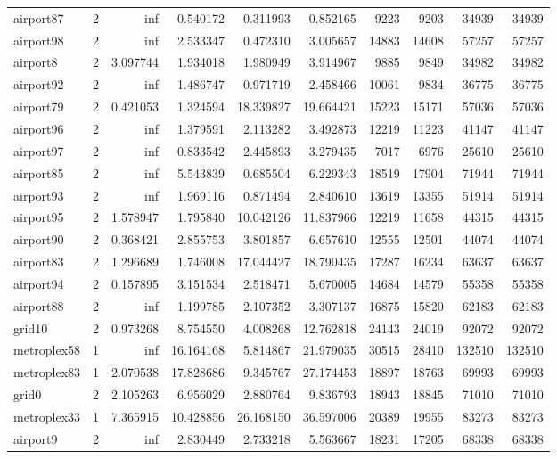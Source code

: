 \begin{longtable}{|l|r|r|r|r|r|r|r|r|r|}
airport87 & 2 & inf & 0.540172 & 0.311993 & 0.852165 & 9223 & 9203 & 34939 & 34939 \\
airport98 & 2 & inf & 2.533347 & 0.472310 & 3.005657 & 14883 & 14608 & 57257 & 57257 \\
airport8 & 2 & 3.097744 & 1.934018 & 1.980949 & 3.914967 & 9885 & 9849 & 34982 & 34982 \\
airport92 & 2 & inf & 1.486747 & 0.971719 & 2.458466 & 10061 & 9834 & 36775 & 36775 \\
airport79 & 2 & 0.421053 & 1.324594 & 18.339827 & 19.664421 & 15223 & 15171 & 57036 & 57036 \\
airport96 & 2 & inf & 1.379591 & 2.113282 & 3.492873 & 12219 & 11223 & 41147 & 41147 \\
airport97 & 2 & inf & 0.833542 & 2.445893 & 3.279435 & 7017 & 6976 & 25610 & 25610 \\
airport85 & 2 & inf & 5.543839 & 0.685504 & 6.229343 & 18519 & 17904 & 71944 & 71944 \\
airport93 & 2 & inf & 1.969116 & 0.871494 & 2.840610 & 13619 & 13355 & 51914 & 51914 \\
airport95 & 2 & 1.578947 & 1.795840 & 10.042126 & 11.837966 & 12219 & 11658 & 44315 & 44315 \\
airport90 & 2 & 0.368421 & 2.855753 & 3.801857 & 6.657610 & 12555 & 12501 & 44074 & 44074 \\
airport83 & 2 & 1.296689 & 1.746008 & 17.044427 & 18.790435 & 17287 & 16234 & 63637 & 63637 \\
airport94 & 2 & 0.157895 & 3.151534 & 2.518471 & 5.670005 & 14684 & 14579 & 55358 & 55358 \\
airport88 & 2 & inf & 1.199785 & 2.107352 & 3.307137 & 16875 & 15820 & 62183 & 62183 \\
grid10 & 2 & 0.973268 & 8.754550 & 4.008268 & 12.762818 & 24143 & 24019 & 92072 & 92072 \\
metroplex58 & 1 & inf & 16.164168 & 5.814867 & 21.979035 & 30515 & 28410 & 132510 & 132510 \\
metroplex83 & 1 & 2.070538 & 17.828686 & 9.345767 & 27.174453 & 18897 & 18763 & 69993 & 69993 \\
grid0 & 2 & 2.105263 & 6.956029 & 2.880764 & 9.836793 & 18943 & 18845 & 71010 & 71010 \\
metroplex33 & 1 & 7.365915 & 10.428856 & 26.168150 & 36.597006 & 20389 & 19955 & 83273 & 83273 \\
airport9 & 2 & inf & 2.830449 & 2.733218 & 5.563667 & 18231 & 17205 & 68338 & 68338 \\

\end{longtable}
